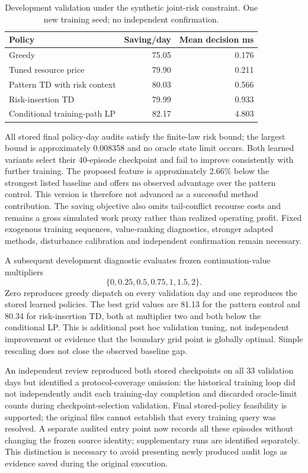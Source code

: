 \documentclass[11pt,a4paper]{article}
\begin{document}
\begin{table}[ht]
\centering\caption{Development validation under the synthetic joint-risk constraint. One new training seed; no independent confirmation.}
\begin{tabular}{lrr}\toprule
Policy & Saving/day & Mean decision ms\\\midrule
Greedy &75.05&0.176\\
Tuned resource price &79.90&0.211\\
Pattern TD with risk context &80.03&0.566\\
Risk-insertion TD &79.99&0.933\\
Conditional training-path LP &82.17&4.803\\\bottomrule
\end{tabular}
\end{table}

All stored final policy-day audits satisfy the finite-law risk bound; the largest bound is approximately 0.008358 and no oracle state limit occurs. Both learned variants select their 40-episode checkpoint and fail to improve consistently with further training. The proposed feature is approximately 2.66\% below the strongest listed baseline and offers no observed advantage over the pattern control. This version is therefore not advanced as a successful method contribution. The saving objective also omits tail-conflict recourse costs and remains a gross simulated work proxy rather than realized operating profit. Fixed exogenous training sequences, value-ranking diagnostics, stronger adapted methods, disturbance calibration and independent confirmation remain necessary.

A subsequent development diagnostic evaluates frozen continuation-value multipliers
\[
 \{0,0.25,0.5,0.75,1,1.5,2\}.
\]
Zero reproduces greedy dispatch on every validation day and one reproduces the stored learned policies. The best grid values are 81.13 for the pattern control and 80.34 for risk-insertion TD, both at multiplier two and both below the conditional LP. This is additional post hoc validation tuning, not independent improvement or evidence that the boundary grid point is globally optimal. Simple rescaling does not close the observed baseline gap.

An independent review reproduced both stored checkpoints on all 33 validation days but identified a protocol-coverage omission: the historical training loop did not independently audit each training-day completion and discarded oracle-limit counts during checkpoint-selection validation. Final stored-policy feasibility is supported; the original files cannot establish that every training query was resolved. A separate audited entry point now records all these episodes without changing the frozen source identity; supplementary runs are identified separately. This distinction is necessary to avoid presenting newly produced audit logs as evidence saved during the original execution.
\end{document}
